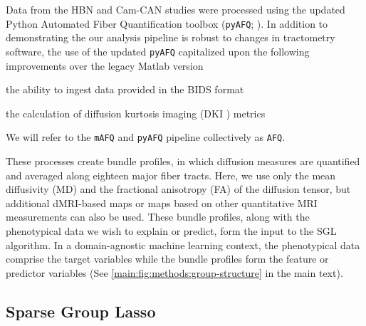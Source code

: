 \documentclass[10pt,%
               aps,%
               prl,%
               reprint,%
               superscriptaddress,%
               preprintnumbers,%
               linenumbers,%
               amsmath,%
               floatfix]{revtex4-2}
\begin{document}
Data from the HBN and Cam-CAN studies were processed using the updated Python
Automated Fiber Quantification toolbox (\texttt{pyAFQ}; \cite{pyAFQ}). In
addition to demonstrating the our analysis pipeline is robust to changes in
tractometry software, the use of the updated \texttt{pyAFQ} capitalized upon
the following improvements over the legacy Matlab version
\begin{enumerate*}[%
    label=(\roman*),%
    before=\unskip{: },%
    itemjoin={{, }},%
    itemjoin*={{, and }}]
    \item the ability to ingest data provided in the BIDS format
    \cite{gorgolewski2016brain}
    \item the calculation of diffusion kurtosis imaging (DKI
    \cite{jensen2005diffusion}) metrics
\end{enumerate*}
We will refer to the \texttt{mAFQ} and \texttt{pyAFQ} pipeline collectively
as \texttt{AFQ}.

These processes create bundle profiles, in which diffusion measures
are quantified and averaged along eighteen major fiber tracts. Here,
we use only the mean diffusivity (MD) and the fractional anisotropy
(FA) of the diffusion tensor, but additional dMRI-based maps or maps
based on other quantitative MRI measurements can also be used. These
bundle profiles, along with the phenotypical data we wish to explain
or predict, form the input to the SGL algorithm. In a domain-agnostic
machine learning context, the phenotypical data comprise the target
variables while the bundle profiles form the feature or predictor
variables (See \cref{main:fig:methods:group-structure} in the main text).

\subsection{Sparse Group Lasso}
\label{sec:sgl}
\end{document}
